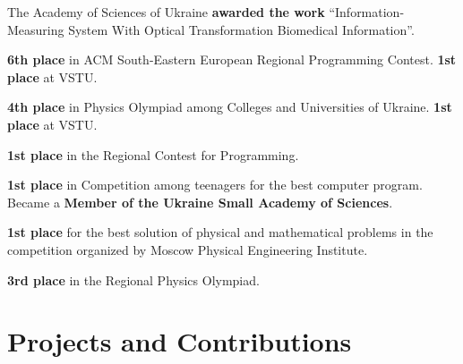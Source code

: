 \documentclass[12pt,overlapped,line]{res}
\newcommand{\mplace}[1]{\textbf{#1}}
\begin{document}
\begin{resume}
 \begin{position}
   The Academy of Sciences of Ukraine \mplace{awarded the work}
   ``Information-Measuring System With Optical Transformation
   Biomedical Information''.
 \end{position}

 \begin{position}
   \mplace{6th place} in ACM South-Eastern European Regional
   Programming Contest. \mplace{1st place} at VSTU.
 \end{position}

 \begin{position}
   \mplace{4th place} in Physics Olympiad among Colleges and
   Universities of Ukraine. \mplace{1st place} at VSTU.
 \end{position}

 \begin{position}
 \mplace{1st place} in the Regional Contest for Programming.
 \end{position}

 \begin{position}
   \mplace{1st place} in Competition among teenagers for the best
   computer program. Became a \mplace{Member of the Ukraine Small Academy
     of Sciences}.
 \end{position}

 \begin{position}
   \mplace{1st place} for the best solution of physical and mathematical
   problems in the competition organized by Moscow Physical Engineering Institute.
 \end{position}

 \begin{position}
   \mplace{3rd place} in the Regional Physics Olympiad.

 \end{position}

 \section{Projects and Contributions}

 \begin{itemize}[parsep=0.2em,leftmargin=1em]


\end{itemize}
\end{resume}
\end{document}
